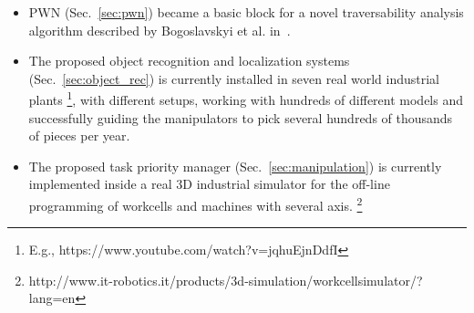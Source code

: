 \documentclass[conference]{IEEEtran}
\begin{document}
\begin{itemize}
 \item PWN (Sec.~\ref{sec:pwn}) became a basic block for a novel traversability analysis algorithm described by Bogoslavskyi et al. in~\cite{bogoslavskyi-ECMR-13}.
 \item The proposed object recognition and localization systems (Sec.~\ref{sec:object_rec}) is currently installed in seven real world industrial plants \footnote{E.g., https://www.youtube.com/watch?v=jqhuEjnDdfI}, with different setups, working with hundreds of different models and successfully guiding the manipulators to pick several hundreds of thousands of pieces per year. 
 \item The proposed task priority manager (Sec.~\ref{sec:manipulation}) is currently implemented inside a real 3D industrial simulator for the off-line programming of workcells and machines with several axis.  \footnote{http://www.it-robotics.it/products/3d-simulation/workcellsimulator/?lang=en}
\end{itemize}


 

\end{document}
